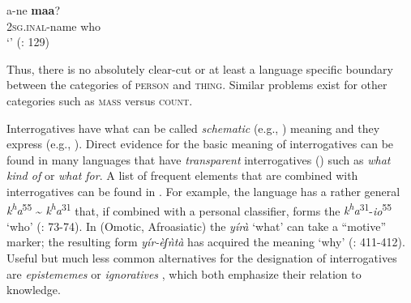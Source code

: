     \ex
    \gll a-ne \textbf{{maa}}?\\
    2\textsc{sg.}\textsc{inal}-name  who\\
    \glt ‘’ (\citealt{Kratochvíl2007}: 129)
    \z
    \z

\noindent Thus, there is no absolutely clear-cut or at least a language specific boundary between the categories of \textsc{person} and \textsc{thing}. Similar problems exist for other categories such as \textsc{mass} versus \textsc{count}.

Interrogatives have what can be called \textit{schematic} (e.g., \citealt{Langacker2008}) meaning and they express  (e.g., \citealt{Schulze2007}). Direct evidence for the basic meaning of interrogatives can be found in many languages that have \textit{transparent} interrogatives (\citealt{MuyskenSmith1990}) such as  \textit{what kind of} or \textit{what for}. A list of frequent elements that are combined with interrogatives can be found in . For example, the  language  has a rather general  \textit{k\textsuperscript{h}}\textit{a}\textsuperscript{55} {\textasciitilde} \textit{k\textsuperscript{h}}\textit{a}\textsuperscript{31} that, if combined with a personal classifier, forms the  \textit{k\textsuperscript{h}}\textit{a}\textsuperscript{31}-\textit{io}\textsuperscript{55} ‘who’ (\citealt{SunHongkai2009}: 73-74). In  (Omotic, Afroasiatic) the  \textit{yírà} ‘what’ can take a “motive” marker; the resulting form \textit{yír-èʃǹtà} has acquired the meaning ‘why’ (\citealt{Hellenthal2010}: 411-412). Useful but much less common alternatives for the designation of interrogatives are \textit{epistememes} \citep{Mushin1995} or \textit{ignoratives} \citep[443-461]{Miyaoka2012}, which both emphasize their relation to knowledge.

